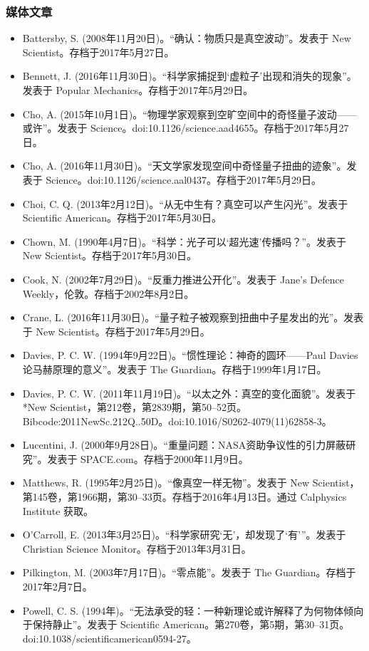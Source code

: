 \subsubsection{媒体文章}
\begin{itemize}
\item Battersby, S. (2008年11月20日)。“确认：物质只是真空波动”。发表于 New Scientist。存档于2017年5月27日。
\item Bennett, J. (2016年11月30日)。“科学家捕捉到‘虚粒子’出现和消失的现象”。发表于 Popular Mechanics。存档于2017年5月29日。
\item Cho, A. (2015年10月1日)。“物理学家观察到空旷空间中的奇怪量子波动——或许”。发表于 Science。doi:10.1126/science.aad4655。存档于2017年5月27日。
\item Cho, A. (2016年11月30日)。“天文学家发现空间中奇怪量子扭曲的迹象”。发表于 Science。doi:10.1126/science.aal0437。存档于2017年5月29日。
\item Choi, C. Q. (2013年2月12日)。“从无中生有？真空可以产生闪光”。发表于 Scientific American。存档于2017年5月30日。
\item Chown, M. (1990年4月7日)。“科学：光子可以‘超光速’传播吗？”。发表于 New Scientist。存档于2017年5月30日。
\item Cook, N. (2002年7月29日)。“反重力推进公开化”。发表于 Jane's Defence Weekly，伦敦。存档于2002年8月2日。
\item Crane, L. (2016年11月30日)。“量子粒子被观察到扭曲中子星发出的光”。发表于 New Scientist。存档于2017年5月29日。
\item Davies, P. C. W. (1994年9月22日)。“惯性理论：神奇的圆环——Paul Davies论马赫原理的意义”。发表于 The Guardian。存档于1999年1月17日。
\item Davies, P. C. W. (2011年11月19日)。“以太之外：真空的变化面貌”。发表于 *New Scientist，第212卷，第2839期，第50–52页。Bibcode:2011NewSc.212Q..50D。doi:10.1016/S0262-4079(11)62858-3。
\item Lucentini, J. (2000年9月28日)。“重量问题：NASA资助争议性的引力屏蔽研究”。发表于 SPACE.com。存档于2000年11月9日。
\item Matthews, R. (1995年2月25日)。“像真空一样无物”。发表于 New Scientist，第145卷，第1966期，第30–33页。存档于2016年4月13日。通过 Calphysics Institute 获取。
\item O'Carroll, E. (2013年3月25日)。“科学家研究‘无’，却发现了‘有’”。发表于 Christian Science Monitor。存档于2013年3月31日。
\item Pilkington, M. (2003年7月17日)。“零点能”。发表于 The Guardian。存档于2017年2月7日。
\item Powell, C. S. (1994年)。“无法承受的轻：一种新理论或许解释了为何物体倾向于保持静止”。发表于 Scientific American。第270卷，第5期，第30–31页。doi:10.1038/scientificamerican0594-27。

\end{itemize}
